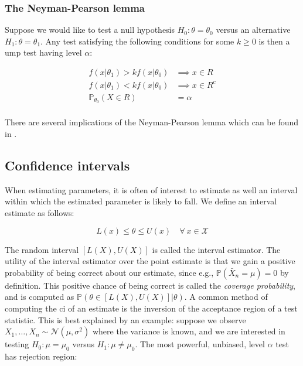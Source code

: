 \documentclass{report}
\begin{document}
\subsubsection{The Neyman-Pearson lemma}

Suppose we would like to test a null hypothesis $H_0 \colon \theta = \theta_0$ versus an alternative $H_1 \colon \theta = \theta_1$. Any test satisfying the following conditions for some $k \geq 0$ is then a \gls{ump} test having level $\alpha$:

\begin{equation}\label{eq:neyman-pearson-lemma}
    \begin{aligned}
        f(x|\theta_1) > k f(x|\theta_0) &\implies x \in R \\
        f(x|\theta_1) < k f(x|\theta_0) &\implies x \in R^c \\
        \mathbb{P}_{\theta_0}(X \in R) &= \alpha \\
    \end{aligned}
\end{equation}

There are several implications of the Neyman-Pearson lemma which can be found in \cite[Chapter~8.3.2]{casella_statistical_2002}. 

\subsection{Confidence intervals}

When estimating parameters, it is often of interest to estimate as well an interval within which the estimated parameter is likely to fall. We define an interval estimate as follows:

\begin{equation}\label{eq:interval-estimator}
    L(x) \leq \theta \leq U(x) \quad \forall \: x \in \mathcal{X}
\end{equation}

The random interval $[L(X), U(X)]$ is called the interval estimator. The utility of the interval estimator over the point estimate is that we gain a positive probability of being correct about our estimate, since e.g., $\mathbb{P}(\bar{X}_n = \mu) = 0$ by definition. This positive chance of being correct is called the \textit{coverage probability}, and is computed as $\mathbb{P}(\theta \in [L(X), U(X)] | \theta)$. A common method of computing the \gls{ci} of an estimate is the inversion of the acceptance region of a test statistic. This is best explained by an example: suppose we observe $X_1, \dots, X_n \sim \mathcal{N}(\mu, \sigma^2)$ where the variance is known, and we are interested in testing $H_0 \colon \mu = \mu_0$ versus $H_1 \colon \mu \neq \mu_0$. The most powerful, unbiased, level $\alpha$ test has rejection region:
\end{document}
